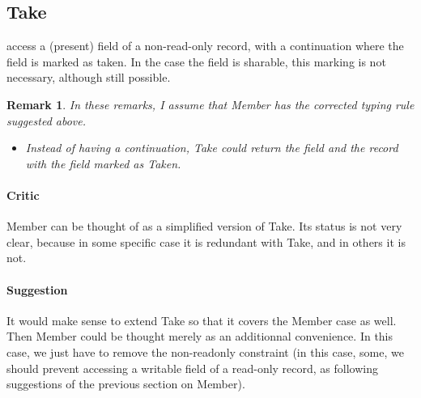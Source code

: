 \documentclass{article}
\newtheorem{remark}[theorem]{Remark}
\begin{document}
\subsection{Take}
    access a (present) field of a non-read-only record, with a continuation where
    the field is marked as taken. In the case the field is sharable,
    this marking is not necessary, although still possible.
    \begin{remark}
      In these remarks, I assume that Member has the corrected typing rule
      suggested above.
      \begin{itemize}
      \item Instead of having a continuation, Take could return the field and the record 
        with the field marked as Taken.
        \end{itemize}
        \end{remark}
        \paragraph{Critic}
        Member can be thought of as a simplified version of Take. Its status is
        not very clear, because in some specific case it is redundant with Take,
        and in others it is not.
\paragraph{Suggestion}
It would make sense to extend Take so that it covers the Member case as well.
Then Member could be thought merely as an additionnal convenience.
In this case, we just have to remove the non-readonly constraint (in this case,
some, we should prevent accessing a writable field of a read-only record, as
following suggestions of the previous section on Member).
\end{document}
